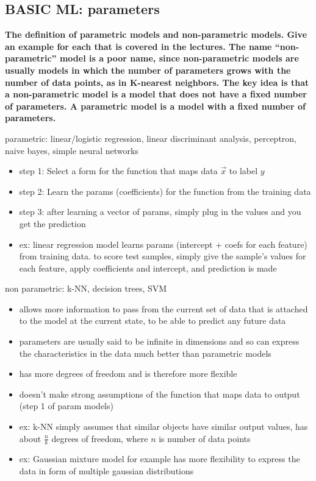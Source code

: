 \documentclass[10pt,letterpaper]{article}
\begin{document}
\subsection{BASIC ML: parameters}
\subitem \textbf{ The definition of parametric models and non-parametric models. Give an example for each that is covered in the lectures. The name “non-parametric” model is a poor name, since non-parametric models are usually models in which the number of parameters grows with the number of data points, as in K-nearest neighbors. The key idea is that a non-parametric model is a model that does not have a fixed number of parameters. A parametric model is a model with a fixed number of parameters. }
\begin{solution}
parametric: linear/logistic regression, linear discriminant analysis, perceptron, naive bayes, simple neural networks
\begin{itemize}
\item step 1: Select a form for the function that maps data $\vec{x}$ to label $y$
\item step 2: Learn the params (coefficients) for the function from the training data
\item step 3: after learning a vector of params, simply plug in the values and you get the prediction
\item ex: linear regression model learns params (intercept + coefs for each feature) from training data. to score test samples, simply give the sample's values for each feature, apply coefficients and intercept, and prediction is made
\end{itemize}

non parametric: k-NN, decision trees, SVM
\begin{itemize}
\item allows more information to pass from the current set of data that is attached to the model at the current state, to be able to predict any future data
\item parameters are usually said to be infinite in dimensions and so can express the characteristics in the data much better than parametric models
\item has more degrees of freedom and is therefore more flexible 
\item doesn't make strong assumptions of the function that maps data to output (step 1 of param models)
\item ex: k-NN simply assumes that similar objects have similar output values, has about $\frac{n}{k}$ degrees of freedom, where $n$ is number of data points
\item ex: Gaussian mixture model for example has more flexibility to express the data in form of multiple gaussian distributions
\end{itemize}
\end{solution}
\end{document}
